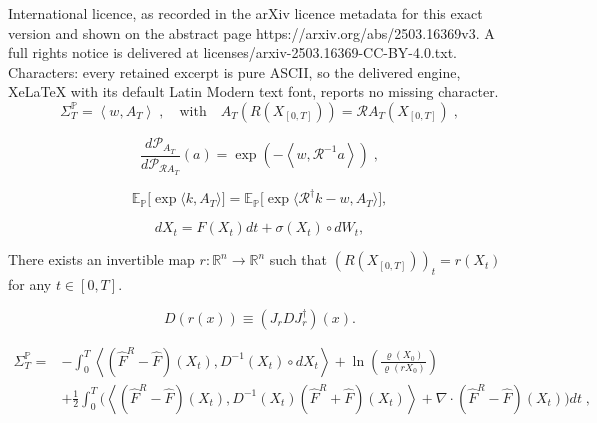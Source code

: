 \documentclass[10pt,a4paper]{amsart}
\begin{document}
International licence, as recorded in the arXiv licence metadata for this exact version and shown on the abstract page https://arxiv.org/abs/2503.16369v3. A full rights notice is delivered at licenses/arxiv-2503.16369-CC-BY-4.0.txt. Characters: every retained excerpt is pure ASCII, so the delivered engine, XeLaTeX with its default Latin Modern text font, reports no missing character.
\begin{equation}\label{eq:ass1}
   \varSigma_{T}^{\mathbb{P}}=\left\langle w, A_T\right\rangle \; , \quad \text{with}  \quad A_T\left(R\left(X_{\left[0,T\right]}\right)\right)=\mathcal{R}A_T\left(X_{\left[0,T\right]}\right) \;,
\end{equation}

  \begin{equation}\label{eq:beau}
\frac{d\mathcal{P}_{A_T}}{d\mathcal{P}_{\mathcal{R}A_T}}(a)=\exp \left(-\left\langle w,\mathcal{R}^{-1} a\right\rangle \right) \; ,
\end{equation}

    \begin{equation}\label{eq:MRF-2-1-1}
\mathbb{E}_{\mathbb{P}}\Big[\exp\Big\langle k,A_T\Big\rangle \Big]=\mathbb{E}_{\mathbb{P}}\Big[\exp \Big\langle \mathcal{R}^{\dagger} k -
w,A_T\Big\rangle \Big] ,
    \end{equation}

\begin{equation}\label{eq:diff}
dX_{t}=F(X_{t})dt+ \sigma(X_{t})\circ dW_t,
\end{equation}

\begin{assumption}\label{ass:local}
 There exists an invertible map $r : \mathbb{R}^n \to \mathbb{R}^n$ such that $\left(R\left(X_{\left[0,T\right]}\right)\right)_{t}=r\left(X_{t}\right)$ for any $t \in [0,T]$.    
\end{assumption}

\begin{equation}\label{eq:Dinvariant}
D\left(r\left(x\right)\right)\equiv\left(J_{r} D J_{r}^\dag\right)(x).
\end{equation}

\begin{align}\label{eq:girsanov}
    \varSigma_{T}^{\mathbb{P}}=& -\int_{0}^{T} \left\langle \left(\widehat{F}^R-\widehat{F}\right)(X_{t}),D^{-1}(X_{t})\circ dX_{t}\right\rangle + \ln\left(\frac{\varrho(X_0)}{\varrho(rX_0)}\right) \nonumber \\
    & + \frac{1}{2}\int_{0}^{T} \Big( \left\langle  \left(\widehat{F}^R -\widehat{F}\right)(X_{t}),D^{-1}(X_{t})\left(\widehat{F}^R+\widehat{F}\right)(X_{t})\right\rangle + \nabla \cdot \left(\widehat{F}^R- \widehat{F}\right)(X_{t}) \Big) dt \;,
\end{align}
\end{document}
